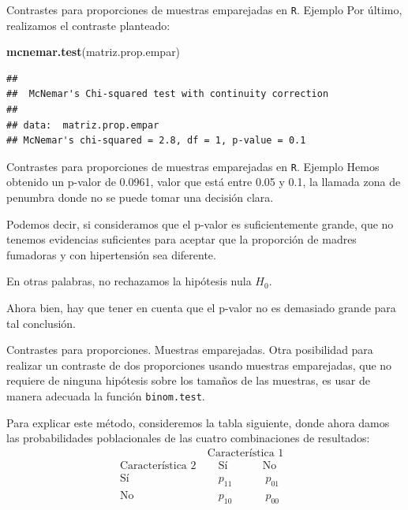 \documentclass[
  ignorenonframetext,
]{beamer}
\newenvironment{Shaded}{\begin{snugshade}}{\end{snugshade}}
\newcommand{\KeywordTok}[1]{\textcolor[rgb]{0.13,0.29,0.53}{\textbf{#1}}}
\newcommand{\NormalTok}[1]{#1}
\begin{document}
\begin{frame}[fragile]{Contrastes para proporciones de muestras
emparejadas en \texttt{R}. Ejemplo}
\protect\hypertarget{contrastes-para-proporciones-de-muestras-emparejadas-en-r.-ejemplo-3}{}
Por último, realizamos el contraste planteado:

\begin{Shaded}
\begin{Highlighting}[]
\KeywordTok{mcnemar.test}\NormalTok{(matriz.prop.empar)}
\end{Highlighting}
\end{Shaded}

\begin{verbatim}
## 
##  McNemar's Chi-squared test with continuity correction
## 
## data:  matriz.prop.empar
## McNemar's chi-squared = 2.8, df = 1, p-value = 0.1
\end{verbatim}
\end{frame}

\begin{frame}{Contrastes para proporciones de muestras emparejadas en
\texttt{R}. Ejemplo}
\protect\hypertarget{contrastes-para-proporciones-de-muestras-emparejadas-en-r.-ejemplo-4}{}
Hemos obtenido un p-valor de 0.0961, valor que está entre 0.05 y 0.1, la
llamada zona de penumbra donde no se puede tomar una decisión clara.

Podemos decir, si consideramos que el p-valor es suficientemente grande,
que no tenemos evidencias suficientes para aceptar que la proporción de
madres fumadoras y con hipertensión sea diferente.

En otras palabras, no rechazamos la hipótesis nula \(H_0\).

Ahora bien, hay que tener en cuenta que el p-valor no es demasiado
grande para tal conclusión.
\end{frame}

\begin{frame}[fragile]{Contrastes para proporciones. Muestras
emparejadas.}
\protect\hypertarget{contrastes-para-proporciones.-muestras-emparejadas.}{}
Otra posibilidad para realizar un contraste de dos proporciones usando
muestras emparejadas, que no requiere de ninguna hipótesis sobre los
tamaños de las muestras, es usar de manera adecuada la función
\texttt{binom.test}.

Para explicar este método, consideremos la tabla siguiente, donde ahora
damos las probabilidades poblacionales de las cuatro combinaciones de
resultados: \[
\begin{array}{r|c}
 & \ \mbox{Característica 1}\  \\
\mbox{Característica 2} &\quad \ \!\mbox{Sí}\qquad\quad\, \mbox{No}\quad \\\hline
 \mbox{Sí} & \quad \  p_{11}  \qquad\quad p_{01}\quad  \\
 \mbox{No} & \quad \  p_{10} \qquad\quad  p_{00}\quad
 \end{array}
\]
\end{frame}
\end{document}
